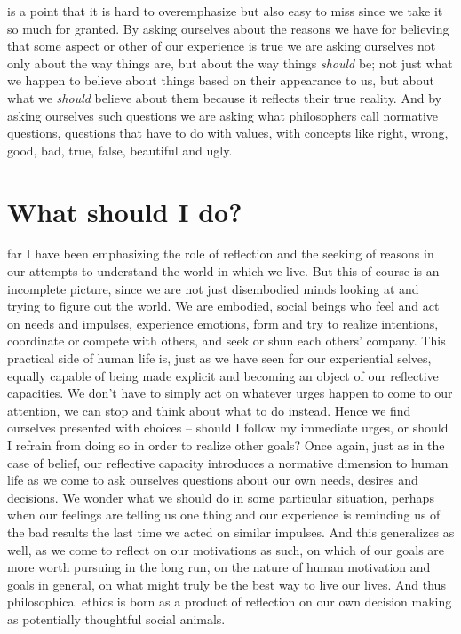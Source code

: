\documentclass[justified]{tufte-book}
\begin{document}
 is a point that it is hard to overemphasize but also easy to miss since we take it so much for granted. By asking ourselves about the reasons we have for believing that some aspect or other of our experience is true we are asking ourselves not only about the way things are, but about the way things \emph{should} be; not just what we happen to believe about things based on their appearance to us, but about what we \emph{should} believe about them because it reflects their true reality. And by asking ourselves such questions we are asking what philosophers call normative questions, questions that have to do with values, with concepts like right, wrong, good, bad, true, false, beautiful and ugly.

\hypertarget{what-should-i-do}{%
\section{What should I do?}\label{what-should-i-do}}

 far I have been emphasizing the role of reflection and the seeking of reasons in our attempts to understand the world in which we live. But this of course is an incomplete picture, since we are not just disembodied minds looking at and trying to figure out the world. We are embodied, social beings who feel and act on needs and impulses, experience emotions, form and try to realize intentions, coordinate or compete with others, and seek or shun each others' company. This practical side of human life is, just as we have seen for our experiential selves, equally capable of being made explicit and becoming an object of our reflective capacities. We don't have to simply act on whatever urges happen to come to our attention, we can stop and think about what to do instead. Hence we find ourselves presented with choices -- should I follow my immediate urges, or should I refrain from doing so in order to realize other goals? Once again, just as in the case of belief, our reflective capacity introduces a normative dimension to human life as we come to ask ourselves questions about our own needs, desires and decisions. We wonder what we should do in some particular situation, perhaps when our feelings are telling us one thing and our experience is reminding us of the bad results the last time we acted on similar impulses. And this generalizes as well, as we come to reflect on our motivations as such, on which of our goals are more worth pursuing in the long run, on the nature of human motivation and goals in general, on what might truly be the best way to live our lives. And thus philosophical ethics is born as a product of reflection on our own decision making as potentially thoughtful social animals.
\end{document}
